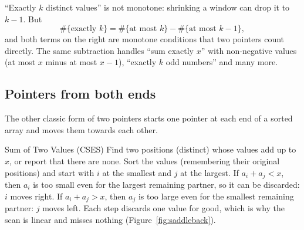 \begin{trick}[Exactly $k$ = at most $k$ $-$ at most $k - 1$]
``Exactly $k$ distinct values'' is not monotone: shrinking a window can drop it to $k - 1$. But
\[
  \#\{\text{exactly } k\} = \#\{\text{at most } k\} - \#\{\text{at most } k - 1\},
\]
and both terms on the right are monotone conditions that two pointers count directly. The same subtraction handles ``sum
exactly $x$'' with non-negative values (at most $x$ minus at most $x - 1$), ``exactly $k$ odd numbers'' and many more.
\end{trick}

\subsection{Pointers from both ends}

The other classic form of two pointers starts one pointer at each end of a sorted array and moves them towards each other.

\begin{problem}{Sum of Two Values (CSES)}
Find two positions (distinct) whose values add up to $x$, or report that there are none.
\solution Sort the values (remembering their original positions) and start with $i$ at the smallest and $j$ at the largest.
If $a_i + a_j < x$, then $a_i$ is too small even for the largest remaining partner, so it can be discarded: $i$ moves right.
If $a_i + a_j > x$, then $a_j$ is too large even for the smallest remaining partner: $j$ moves left. Each step discards one
value for good, which is why the scan is linear and misses nothing (Figure~\ref{fig:saddleback}).
\end{problem}

